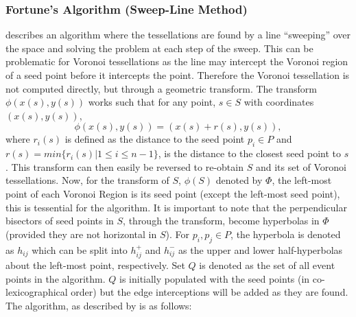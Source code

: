 \subsubsection{Fortune's Algorithm (Sweep-Line Method)}\label{tes:ssec:fort}
\citet{fortune1987sweepline} describes an algorithm where the tessellations are found by a line ``sweeping'' over the space and solving the problem at each step of the sweep. This can be problematic for Voronoi tessellations as the line may intercept the Voronoi region of a seed point before it intercepts the point. Therefore the Voronoi tessellation is not computed directly, but through a geometric transform. The transform $\phi(x(s),y(s))$ works such that for any point, $s \in S$ with coordinates $(x(s),y(s))$, 
\begin{equation}
  \phi(x(s),y(s)) = (x(s) + r(s), y(s)),
\end{equation}
where $r_i(s)$ is defined as the distance to the seed point $p_i \in P$ and $r(s) = min\{r_i(s) | 1 \leq i \leq n-1\}$, is the distance to the closest seed point to $s$. This transform can then easily be reversed to re-obtain $S$ and its set of Voronoi tessellations. Now, for the transform of $S$, $\phi(S)$ denoted by $\Phi$, the left-most point of each Voronoi Region is its seed point (except the left-most seed point), this is tessential for the algorithm. It is important to note that the perpendicular bisectors of seed points in $S$, through the transform, become hyperbolas in $\Phi$ (provided they are not horizontal in $S$). For $p_i,p_j\in P$, the hyperbola is denoted as $h_{ij}$ which can be split into $h^+_{ij}$ and $h^-_{ij}$ as the upper and lower half-hyperbolas about the left-most point, respectively. Set $Q$ is denoted as the set of all event points in the algorithm. $Q$ is initially populated with the seed points (in co-lexicographical order) but the edge interceptions will be added as they are found. The algorithm, as described by \citet{okabe2009spatial} is as follows:
